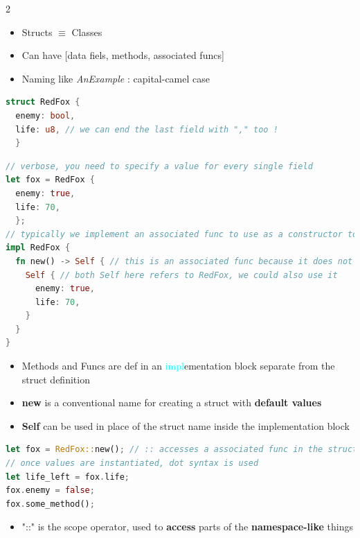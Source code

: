 \documentclass{report}
\begin{document}
\begin{multicols*}{2}

\begin{itemize}
  \item Structs $\equiv $ Classes 
  \item Can have [data fiels, methods, associated funcs] 
  \item Naming like \textit{AnExample} : capital-camel case 
\end{itemize}

\begin{tcolorbox}[title=Syntax,colback=backcolour,size=small,left=4mm]
\begin{lstlisting}[language=rust]
struct RedFox {
  enemy: bool,
  life: u8, // we can end the last field with "," too !
  }
\end{lstlisting}
\end{tcolorbox}

\begin{tcolorbox}[title=Init Struct,colback=backcolour,size=small,left=4mm]
\begin{lstlisting}[language=rust]
// verbose, you need to specify a value for every single field
let fox = RedFox {
  enemy: true,
  life: 70,
  }; 
// typically we implement an associated func to use as a constructor to create a struct with default values and then call that
impl RedFox {
  fn new() -> Self { // this is an associated func because it does not have a form of self as its first param
    Self { // both Self here refers to RedFox, we could also use it 
      enemy: true,
      life: 70,
    }
  }
}
\end{lstlisting}
\end{tcolorbox}

\begin{itemize}
  \item Methods and Funcs are def in an \textcolor{cyan}{impl}ementation block separate from the struct definition 
  \item \textbf{new} is a conventional name for creating a struct with \textbf{default values} 
  \item \textbf{Self} can be used in place of the struct name inside the implementation block 
\end{itemize}

\begin{tcolorbox}[title=Creating,colback=backcolour,size=small,left=4mm]
\begin{lstlisting}[language=rust]
let fox = RedFox::new(); // :: accesses a associated func in the struct
// once values are instantiated, dot syntax is used
let life_left = fox.life;
fox.enemy = false;
fox.some_method();
\end{lstlisting}
\end{tcolorbox}
\begin{itemize}
  \item "::" is the scope operator, used to \textbf{access} parts of the \textbf{namespace-like} things
\end{itemize}


\end{multicols*}
\end{document}
